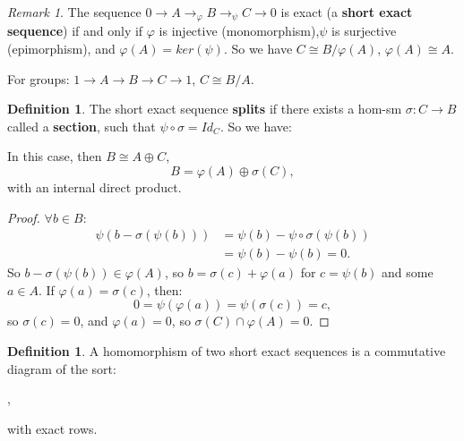 \documentclass[9pt,reqno,twoside]{amsbook}
\theoremstyle{plain}
\numberwithin{section}{chapter}
\numberwithin{equation}{chapter}
\theoremstyle{definition}
\newtheorem{Def}[theorem]{Definition}
\theoremstyle{remark}
\newtheorem{rem}[theorem]{Remark}
\theoremstyle{plain}
\newcommand{\bee}{\begin{equation}\begin{aligned}}
\newcommand{\eee}{\end{aligned}\end{equation}}
\renewcommand{\phi}{\varphi}
\begin{document}
\begin{rem}
The sequence $0 \to A \to_{\phi} B \to_{\psi} C \to 0$ is exact (a \textbf{short exact sequence}) if and only if $\phi$ is injective (monomorphism),$\psi$ is surjective (epimorphism), and $\phi(A) = ker(\psi)$. So we have $C \cong B/\phi(A)$, $\phi(A) \cong A$. 
\end{rem}

For groups: $1 \to A \to B \to C \to 1$, $C \cong B/A$. 

\begin{Def}
The short exact sequence \textbf{splits} if there exists a hom-sm $\sigma:C \to B$ called a \textbf{section}, such that $\psi \circ \sigma = Id_C$. So we have:
\begin{center}
\end{center}
In this case, then $B \cong A \oplus C$,
$$
B = \phi(A) \oplus \sigma(C),
$$
with an internal direct product. 
\end{Def}

\begin{proof} 
$\forall b \in B$:
\bee
\psi(b - \sigma(\psi(b))) &= \psi(b) - \psi \circ \sigma(\psi(b))\\
&= \psi(b) - \psi(b) = 0.
\eee
So $b - \sigma(\psi(b)) \in \phi(A)$, so $b = \sigma(c) + \phi(a)$ for $c = \psi(b)$ and some $a \in A$. If $\phi(a) = \sigma(c)$, then:
$$
0 = \psi(\phi(a)) = \psi(\sigma(c)) = c,
$$
so $\sigma(c) = 0$, and $\phi(a) = 0$, so $\sigma(C) \cap \phi(A) = 0$. 
\end{proof}

\begin{Def}
A homomorphism of two short exact sequences is a commutative diagram of the sort:
\begin{center}
,
\end{center}
with exact rows. 
\end{Def}
\end{document}
